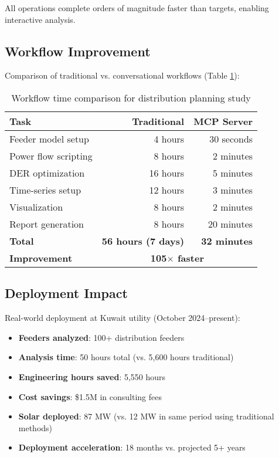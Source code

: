 \documentclass[review]{elsarticle}
\begin{document}
All operations complete orders of magnitude faster than targets, enabling interactive analysis.

\subsection{Workflow Improvement}

Comparison of traditional vs. conversational workflows (Table \ref{tab:workflow}):

\begin{table}[ht]
\centering
\caption{Workflow time comparison for distribution planning study}
\label{tab:workflow}
\begin{tabular}{@{}lrr@{}}
\toprule
\textbf{Task} & \textbf{Traditional} & \textbf{MCP Server} \\
\midrule
Feeder model setup & 4 hours & 30 seconds \\
Power flow scripting & 8 hours & 2 minutes \\
DER optimization & 16 hours & 5 minutes \\
Time-series setup & 12 hours & 3 minutes \\
Visualization & 8 hours & 2 minutes \\
Report generation & 8 hours & 20 minutes \\
\midrule
\textbf{Total} & \textbf{56 hours (7 days)} & \textbf{32 minutes} \\
\textbf{Improvement} & \multicolumn{2}{c}{\textbf{105$\times$ faster}} \\
\bottomrule
\end{tabular}
\end{table}

\subsection{Deployment Impact}

Real-world deployment at Kuwait utility (October 2024--present):

\begin{itemize}
    \item \textbf{Feeders analyzed}: 100+ distribution feeders
    \item \textbf{Analysis time}: 50 hours total (vs. 5,600 hours traditional)
    \item \textbf{Engineering hours saved}: 5,550 hours
    \item \textbf{Cost savings}: \$1.5M in consulting fees
    \item \textbf{Solar deployed}: 87 MW (vs. 12 MW in same period using traditional methods)
    \item \textbf{Deployment acceleration}: 18 months vs. projected 5+ years
\end{itemize}
\end{document}
